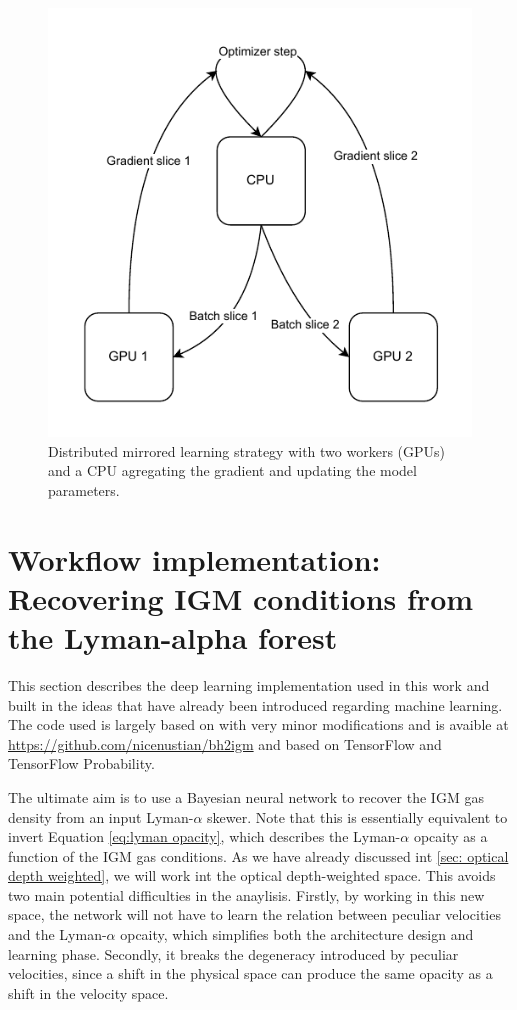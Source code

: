 \begin{figure}
    \centering
    \includegraphics[width=0.6\linewidth]{img/ML/mirror_training.drawio.pdf}
    \caption{Distributed mirrored learning strategy with two workers (GPUs) and a CPU agregating the gradient and updating the model parameters.}
    \label{fig:ML mirror training}
\end{figure}

\section{Workflow implementation: Recovering IGM conditions from the Lyman-alpha forest }
This section describes the deep learning implementation used in this work and built in the ideas that have already been introduced regarding machine learning. The code used is largely based on \cite{nasir2024deep} with very minor modifications and is avaible at \url{https://github.com/nicenustian/bh2igm} and based on TensorFlow and TensorFlow Probability.


The ultimate aim is to use a Bayesian neural network to recover the IGM gas density from an input Lyman-$\alpha$ skewer. Note that this is essentially equivalent to invert Equation \ref{eq:lyman opacity}, which describes the Lyman-$\alpha$ opcaity as a function of the IGM gas conditions. As we have already discussed int \ref{sec: optical depth weighted}, we will work int the optical depth-weighted space. This avoids two main potential difficulties in the anaylisis. Firstly, by working in this new space, the network will not have to learn the relation between peculiar velocities and the Lyman-$\alpha$ opcaity, which simplifies both the architecture design and learning phase. Secondly, it breaks the degeneracy introduced by peculiar velocities, since a shift in the physical space can produce the same opacity as a shift in the velocity space.

